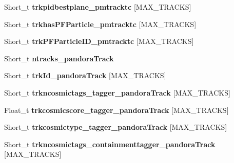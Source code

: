 \begin{DoxyCompactItemize}
\item 
\hypertarget{classanatree_a051594048bebe4a09379ad3c7139d3e3}{Short\-\_\-t {\bfseries trkpidbestplane\-\_\-pmtracktc} \mbox{[}M\-A\-X\-\_\-\-T\-R\-A\-C\-K\-S\mbox{]}}\label{classanatree_a051594048bebe4a09379ad3c7139d3e3}

\item 
\hypertarget{classanatree_ae21229d376f21bb02c0b556a95cc18ff}{Short\-\_\-t {\bfseries trkhas\-P\-F\-Particle\-\_\-pmtracktc} \mbox{[}M\-A\-X\-\_\-\-T\-R\-A\-C\-K\-S\mbox{]}}\label{classanatree_ae21229d376f21bb02c0b556a95cc18ff}

\item 
\hypertarget{classanatree_a6e39a1207f4a1969df07ca79552f55bf}{Short\-\_\-t {\bfseries trk\-P\-F\-Particle\-I\-D\-\_\-pmtracktc} \mbox{[}M\-A\-X\-\_\-\-T\-R\-A\-C\-K\-S\mbox{]}}\label{classanatree_a6e39a1207f4a1969df07ca79552f55bf}

\item 
\hypertarget{classanatree_aba7a2fc1d504be3fd87f32245ccd56c5}{Short\-\_\-t {\bfseries ntracks\-\_\-pandora\-Track}}\label{classanatree_aba7a2fc1d504be3fd87f32245ccd56c5}

\item 
\hypertarget{classanatree_acc16f3ca1721c1b25f12d3d6aa418665}{Short\-\_\-t {\bfseries trk\-Id\-\_\-pandora\-Track} \mbox{[}M\-A\-X\-\_\-\-T\-R\-A\-C\-K\-S\mbox{]}}\label{classanatree_acc16f3ca1721c1b25f12d3d6aa418665}

\item 
\hypertarget{classanatree_a8502a80cca87ae93dcbc0619b539ed24}{Short\-\_\-t {\bfseries trkncosmictags\-\_\-tagger\-\_\-pandora\-Track} \mbox{[}M\-A\-X\-\_\-\-T\-R\-A\-C\-K\-S\mbox{]}}\label{classanatree_a8502a80cca87ae93dcbc0619b539ed24}

\item 
\hypertarget{classanatree_a68274dba0d5fdd18e04edb86e84b918f}{Float\-\_\-t {\bfseries trkcosmicscore\-\_\-tagger\-\_\-pandora\-Track} \mbox{[}M\-A\-X\-\_\-\-T\-R\-A\-C\-K\-S\mbox{]}}\label{classanatree_a68274dba0d5fdd18e04edb86e84b918f}

\item 
\hypertarget{classanatree_aeb0bcbc98bb154bc0ab3869b3b2f64f5}{Short\-\_\-t {\bfseries trkcosmictype\-\_\-tagger\-\_\-pandora\-Track} \mbox{[}M\-A\-X\-\_\-\-T\-R\-A\-C\-K\-S\mbox{]}}\label{classanatree_aeb0bcbc98bb154bc0ab3869b3b2f64f5}

\item 
\hypertarget{classanatree_abd7bb94b6c4a5d6661d5d5b935b39306}{Short\-\_\-t {\bfseries trkncosmictags\-\_\-containmenttagger\-\_\-pandora\-Track} \mbox{[}M\-A\-X\-\_\-\-T\-R\-A\-C\-K\-S\mbox{]}}\label{classanatree_abd7bb94b6c4a5d6661d5d5b935b39306}


\end{DoxyCompactItemize}
